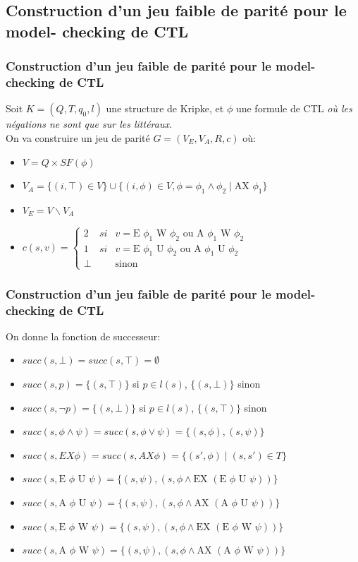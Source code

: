 \documentclass[11pt]{beamer}
\begin{document}
\subsection{Construction d'un jeu faible de parité pour le model- checking de CTL}

\begin{frame}
	\frametitle{Construction d'un jeu faible de parité pour le model- checking de CTL}
Soit $K = (Q,T,q_0,l)$  une structure de Kripke, et $\phi$ une formule de CTL \emph{où les négations ne sont que sur les littéraux}.\\
On va construire un jeu de parité $G = (V_E,V_A,R,c)$ où:
	\begin{itemize}
		\item $V = Q \times SF(\phi)$
		\item $V_A = \{(i, \top ) \in V\} \cup \{(i, \phi) \in V, \phi = \phi_1 \land \phi_2 \mid \mbox{AX } \phi_1 \}$
		\item $V_E = V \backslash V_A$
		\item $c(s,v) = \left \{
		\begin{array}{rcl}
		2 & si & v = \mbox{E } \phi_1 \mbox{ W } \phi_2\text{ ou }\mbox{A } \phi_1 \mbox{ W } \phi_2\\
		1 & si & v = \mbox{E } \phi_1 \mbox{ U } \phi_2\text{ ou }\mbox{A } \phi_1 \mbox{ U } \phi_2\\
		\bot && \text{sinon}
		\end{array}
		\right .$
	\end{itemize}
\end{frame}

\begin{frame}
	\frametitle{Construction d'un jeu faible de parité pour le model- checking de CTL}
On donne la fonction de successeur:
	\begin{itemize}
		\item$ succ(s, \bot) = succ(s, \top) = \emptyset$
		\item $succ(s, p) = \{(s,\top)\}$ si $p \in l(s)$, $\{(s,\bot)\}$ sinon
		\item $succ(s, \neg p) = \{(s,\bot)\}$ si $p \in l(s)$, $\{(s,\top)\}$ sinon
		\item $succ(s,\phi \land \psi) = succ(s, \phi \lor \psi) = \{(s,\phi), (s,\psi) \}$
		\item $succ(s,EX \phi) = succ(s, AX \phi) = \{ (s', \phi) \mid (s,s') \in T \} $
		\item $succ(s, \mbox{E } \phi \mbox{ U } \psi) = \{ (s,\psi), (s, \phi \land \mbox{EX }  (\mbox{E } \phi \mbox{ U } \psi)) \}$
		\item $succ(s, \mbox{A } \phi \mbox{ U } \psi) = \{ (s,\psi), (s, \phi \land \mbox{AX }  (\mbox{A } \phi \mbox{ U } \psi)) \}$
		\item $succ(s, \mbox{E } \phi \mbox{ W } \psi) = \{ (s,\psi), (s, \phi \land \mbox{EX }  (\mbox{E } \phi \mbox{ W } \psi)) \}$
		\item $succ(s, \mbox{A } \phi \mbox{ W } \psi) = \{ (s,\psi), (s, \phi \land \mbox{AX } (\mbox{A } \phi \mbox{ W } \psi)) \}$
	\end{itemize}
\end{frame}
\end{document}
